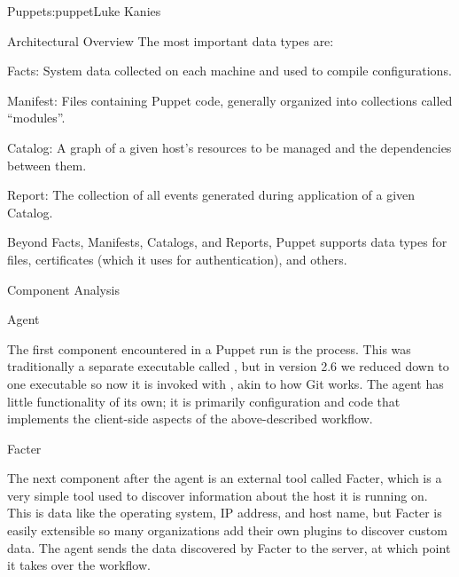 \begin{aosachapter}{Puppet}{s:puppet}{Luke Kanies}
\begin{aosasect1}{Architectural Overview}
The most important data types are:

\begin{aosadescription}

\item{Facts:} System data collected on each machine and used to compile
  configurations.

\item{Manifest:} Files containing Puppet code, generally organized into
  collections called ``modules''.

\item{Catalog:} A graph of a given host's resources to be managed and
  the dependencies between them.

\item{Report:} The collection of all events generated during
  application of a given Catalog.

\end{aosadescription}

Beyond Facts, Manifests, Catalogs, and Reports, Puppet supports data
types for files, certificates (which it uses for authentication), and
others.

\end{aosasect1}

\begin{aosasect1}{Component Analysis}

\begin{aosasect2}{Agent}

The first component encountered in a Puppet run is the 
process.  This was traditionally a separate executable called
, but in version 2.6 we reduced down to one executable so now it
is invoked with , akin to how Git works.  The agent
has little functionality of its own; it is primarily configuration and
code that implements the client-side aspects of the above-described
workflow.

\end{aosasect2}

\begin{aosasect2}{Facter}

The next component after the agent is an external tool called Facter,
which is a very simple tool used to discover information about the
host it is running on.  This is data like the operating system, IP
address, and host name, but Facter is easily extensible so many
organizations add their own plugins to discover custom data.  The
agent sends the data discovered by Facter to the server, at which
point it takes over the workflow.


\end{aosasect2}
\end{aosasect1}
\end{aosachapter}

